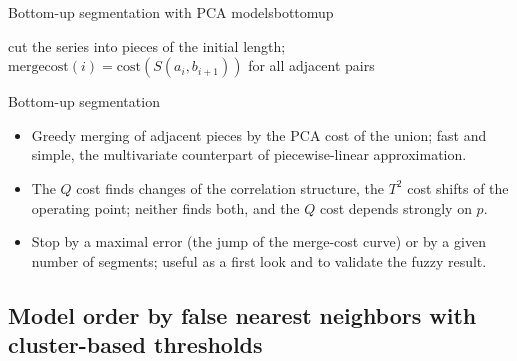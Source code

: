 \begin{algobox}{Bottom-up segmentation with PCA models}{bottomup}
\begin{algorithm}[H]
cut the series into pieces of the initial length; $\mathrm{mergecost}(i)=\mathrm{cost}(S(a_i,b_{i+1}))$ for all adjacent pairs\;
\end{algorithm}
\end{algobox}
\begin{summarybox}{Bottom-up segmentation}
\begin{itemize}
  \item Greedy merging of adjacent pieces by the PCA cost of the union; fast and simple, the multivariate counterpart of piecewise-linear approximation.
  \item The $Q$ cost finds changes of the correlation structure, the $T^2$ cost shifts of the operating point; neither finds both, and the $Q$ cost depends strongly on $p$.
  \item Stop by a maximal error (the jump of the merge-cost curve) or by a given number of segments; useful as a first look and to validate the fuzzy result.
\end{itemize}
\end{summarybox}

\subsection{Model order by false nearest neighbors with cluster-based thresholds}\label{sec:ts:fnn}

